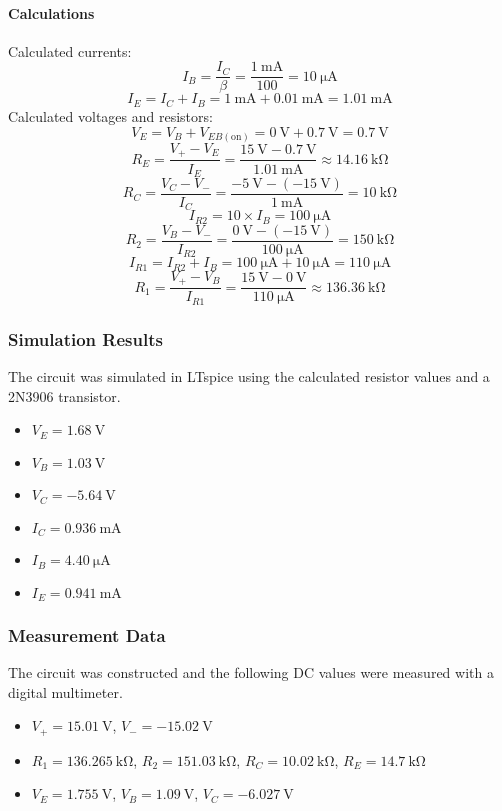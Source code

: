 \documentclass[12pt]{article}
\begin{document}
\paragraph{Calculations}
Calculated currents:
$$
I_B = \frac{I_C}{\beta} = \frac{\SI{1}{\milli\ampere}}{100} = \SI{10}{\micro\ampere}
$$
$$
I_E = I_C + I_B = \SI{1}{\milli\ampere} + \SI{0.01}{\milli\ampere} = \SI{1.01}{\milli\ampere}
$$
Calculated voltages and resistors:
$$
V_E = V_B + V_{EB(\text{on})} = \SI{0}{\volt} + \SI{0.7}{\volt} = \SI{0.7}{\volt}
$$
$$
R_E = \frac{V_{+} - V_E}{I_E} = \frac{\SI{15}{\volt} - \SI{0.7}{\volt}}{\SI{1.01}{\milli\ampere}} \approx \SI{14.16}{\kilo\ohm}
$$
$$
R_C = \frac{V_C - V_{-}}{I_C} = \frac{\SI{-5}{\volt} - (\SI{-15}{\volt})}{\SI{1}{\milli\ampere}} = \SI{10}{\kilo\ohm}
$$
$$
I_{R2} = 10 \times I_B = \SI{100}{\micro\ampere}
$$
$$
R_2 = \frac{V_B - V_{-}}{I_{R2}} = \frac{\SI{0}{\volt} - (\SI{-15}{\volt})}{\SI{100}{\micro\ampere}} = \SI{150}{\kilo\ohm}
$$
$$
I_{R1} = I_{R2} + I_B = \SI{100}{\micro\ampere} + \SI{10}{\micro\ampere} = \SI{110}{\micro\ampere}
$$
$$
R_1 = \frac{V_{+} - V_B}{I_{R1}} = \frac{\SI{15}{\volt} - \SI{0}{\volt}}{\SI{110}{\micro\ampere}} \approx \SI{136.36}{\kilo\ohm}
$$

\subsubsection{Simulation Results}
The circuit was simulated in LTspice using the calculated resistor values and a 2N3906 transistor.
\begin{itemize}
    \item $V_E = \SI{1.68}{\volt}$
    \item $V_B = \SI{1.03}{\volt}$
    \item $V_C = \SI{-5.64}{\volt}$
    \item $I_C = \SI{0.936}{\milli\ampere}$
    \item $I_B = \SI{4.40}{\micro\ampere}$
    \item $I_E = \SI{0.941}{\milli\ampere}$
\end{itemize}

\subsubsection{Measurement Data}
The circuit was constructed and the following DC values were measured with a digital multimeter.
\begin{itemize}
    \item $V_+ = \SI{15.01}{\volt}$, $V_- = \SI{-15.02}{\volt}$
    \item $R_1 = \SI{136.265}{\kilo\ohm}$, $R_2 = \SI{151.03}{\kilo\ohm}$, $R_C = \SI{10.02}{\kilo\ohm}$, $R_E = \SI{14.7}{\kilo\ohm}$
    \item $V_E = \SI{1.755}{\volt}$, $V_B = \SI{1.09}{\volt}$, $V_C = \SI{-6.027}{\volt}$
\end{itemize}
\end{document}
